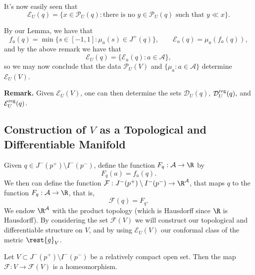 It's now easily seen that
$$\mathcal{E}_U(q)=\{x\in\mathcal{P}_U(q):\text{there is no }y\in\mathcal{P}_U(q)\text{ such that }y\ll x\}.$$

By our Lemma, we have that
$$f_a(q)=\min\{s\in[-1,1]:\mu_a(s)\in J^+(q)\},\qquad \mathcal{E}_a(q)=\mu_a(f_a(q)),$$
and by the above remark we have that
$$\mathcal{E}_U(q)=\{\mathcal{E}_a(q):a\in\mathcal{A}\},$$
so we may now conclude that the data $\mathcal{P}_U(V)$ and $\{\mu_a:a\in\mathcal{A}\}$ determine $\mathcal{E}_U(V)$.  

{\bfseries Remark.} Given $\mathcal{E}_U(V)$, one can then determine the sets $\mathcal{D}_U(q)$, $\mathcal{D}_U^{\text{reg}}(q),$ and $\mathcal{E}_U^{\text{reg}}(q)$.


\subsection{Construction of $V$ as a Topological and Differentiable Manifold}

Given $q\in J^-(p^+)\setminus I^-(p^-)$, define the function $F_q:\mathcal{A}\to\R$ by
$$F_q(a)=f_a(q).$$
We then can define the function $\mathcal{F}:J^-(p^+)\setminus I^-(p^-)\to\R^\mathcal{A}$, that maps $q$ to the function $F_q:\mathcal{A}\to\R$, that is,
$$\mathcal{F}(q)=F_q.$$
We endow $\R^\mathcal{A}$ with the product topology (which is Hausdorff since $\R$ is Hausdorff).  By considering the set $\mathcal{F}(V)$ we will construct our topological and differentiable structure on $V$, and by using $\mathcal{E}_U(V)$ our conformal class of the metric $\rest{g}_V$.

\begin{lem}
    Let $V\subset J^-(p^+)\setminus I^-(p^-)$ be a relatively compact open set.  Then the map $\mathcal{F}:V\to\mathcal{F}(V)$ is a homeomorphism.
\end{lem}

